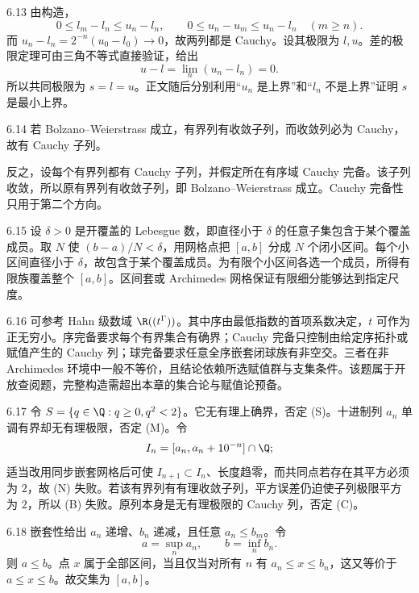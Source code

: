 \begin{solution}{6.13}
由构造，
\[
 0\le l_m-l_n\le u_n-l_n,\qquad
 0\le u_n-u_m\le u_n-l_n\quad(m\ge n).
\]
而 \(u_n-l_n=2^{-n}(u_0-l_0)\to0\)，故两列都是 Cauchy。设其极限为 \(l,u\)。差的极限定理可由三角不等式直接验证，给出
\[
 u-l=\lim_n(u_n-l_n)=0.
\]
所以共同极限为 \(s=l=u\)。正文随后分别利用“\(u_n\) 是上界”和“\(l_n\) 不是上界”证明 \(s\) 是最小上界。
\end{solution}

\begin{solution}{6.14}
若 Bolzano--Weierstrass 成立，有界列有收敛子列，而收敛列必为 Cauchy，故有 Cauchy 子列。

反之，设每个有界列都有 Cauchy 子列，并假定所在有序域 Cauchy 完备。该子列收敛，所以原有界列有收敛子列，即 Bolzano--Weierstrass 成立。Cauchy 完备性只用于第二个方向。
\end{solution}

\begin{solution}{6.15}
设 \(\delta>0\) 是开覆盖的 Lebesgue 数，即直径小于 \(\delta\) 的任意子集包含于某个覆盖成员。取 \(N\) 使 \((b-a)/N<\delta\)，用网格点把 \([a,b]\) 分成 \(N\) 个闭小区间。每个小区间直径小于 \(\delta\)，故包含于某个覆盖成员。为有限个小区间各选一个成员，所得有限族覆盖整个 \([a,b]\)。区间套或 Archimedes 网格保证有限细分能够达到指定尺度。
\end{solution}

\begin{solution}{6.16}
可参考 Hahn 级数域 \(\R((t^\Gamma))\)。其中序由最低指数的首项系数决定，\(t\) 可作为正无穷小。序完备要求每个有界集合有确界；Cauchy 完备只控制由给定序拓扑或赋值产生的 Cauchy 列；球完备要求任意全序嵌套闭球族有非空交。三者在非 Archimedes 环境中一般不等价，且结论依赖所选赋值群与支集条件。该题属于开放查阅题，完整构造需超出本章的集合论与赋值论预备。
\end{solution}

\begin{solution}{6.17}
令 \(S=\{q\in\Q:q\ge0,q^2<2\}\)。它无有理上确界，否定 (S)。十进制列 \(a_n\) 单调有界却无有理极限，否定 (M)。令
\[
 I_n=[a_n,a_n+10^{-n}]\cap\Q;
\]
适当改用同步嵌套网格后可使 \(I_{n+1}\subset I_n\)、长度趋零，而共同点若存在其平方必须为 \(2\)，故 (N) 失败。若该有界列有有理收敛子列，平方误差仍迫使子列极限平方为 \(2\)，所以 (B) 失败。原列本身是无有理极限的 Cauchy 列，否定 (C)。
\end{solution}

\begin{solution}{6.18}
嵌套性给出 \(a_n\) 递增、\(b_n\) 递减，且任意 \(a_n\le b_m\)。令
\[
 a=\sup_n a_n,\qquad b=\inf_n b_n.
\]
则 \(a\le b\)。点 \(x\) 属于全部区间，当且仅当对所有 \(n\) 有 \(a_n\le x\le b_n\)，这又等价于 \(a\le x\le b\)。故交集为 \([a,b]\)。
\end{solution}

